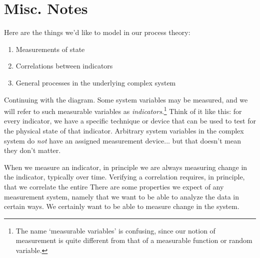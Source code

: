 \documentclass{sig-alternate-05-2015}
\theoremstyle{plain}
\theoremstyle{plain}
\theoremstyle{remark}
\begin{document}



\section{Misc. Notes}

Here are the things we'd like to model in our process theory:
\begin{enumerate}
\item Measurements of state
\item Correlations between indicators
\item General processes in the underlying complex system
\end{enumerate}

Continuing with the diagram. Some system variables may be measured, and we will refer to such measurable variables as \emph{indicators}.\footnote{The name `measurable variables' is confusing, since our notion of measurement is quite different from that of a measurable function or random variable.} Think of it like this: for every indicator, we have a specific technique or device that can be used to test for the physical state of that indicator. Arbitrary system variables in the complex system do \emph{not} have an assigned measurement device... but that doesn't mean they don't matter. 

When we measure an indicator, in principle we are always measuring change in the indicator, typically over time. Verifying a correlation requires, in principle, that we correlate the entire  There are some properties we expect of any measurement system, namely that we want to be able to analyze the data in certain ways. We certainly want to be able to measure change in the system.
\end{document}
